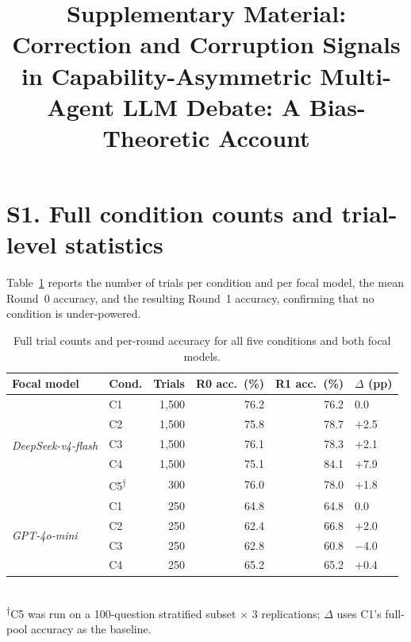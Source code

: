\documentclass[review,3p,authoryear]{elsarticle}
\begin{document}
\begin{frontmatter}

\title{Supplementary Material:\\
Correction and Corruption Signals in Capability-Asymmetric
Multi-Agent LLM Debate:
A Bias-Theoretic Account}



\end{frontmatter}

\linenumbers

\section*{S1. Full condition counts and trial-level statistics}
\label{ssec:counts}

Table~\ref{stab:fullcounts} reports the number of trials per condition and
per focal model, the mean Round~0 accuracy, and the resulting Round~1
accuracy, confirming that no condition is under-powered.

\begin{table}[h]
\centering
\small
\caption{Full trial counts and per-round accuracy for all five conditions
and both focal models.
\label{stab:fullcounts}}
\begin{tabular}{@{}llrrrl@{}}
\toprule
Focal model & Cond. & Trials & R0 acc.\ (\%) & R1 acc.\ (\%) & $\Delta$ (pp) \\
\midrule
\multirow{5}{*}{\textit{DeepSeek-v4-flash}}
  & C1 & 1{,}500 & 76.2 & 76.2 & 0.0 \\
  & C2 & 1{,}500 & 75.8 & 78.7 & $+$2.5 \\
  & C3 & 1{,}500 & 76.1 & 78.3 & $+$2.1 \\
  & C4 & 1{,}500 & 75.1 & 84.1 & $+$7.9 \\
  & C5\textsuperscript{$\dagger$} & 300   & 76.0 & 78.0 & $+$1.8 \\
\midrule
\multirow{4}{*}{\textit{GPT-4o-mini}}
  & C1 & 250   & 64.8 & 64.8 & 0.0 \\
  & C2 & 250   & 62.4 & 66.8 & $+$2.0 \\
  & C3 & 250   & 62.8 & 60.8 & $-$4.0 \\
  & C4 & 250   & 65.2 & 65.2 & $+$0.4 \\
\bottomrule
\end{tabular}
\\[2pt]
{\footnotesize\textsuperscript{$\dagger$}C5 was run on a 100-question
stratified subset $\times$ 3 replications; $\Delta$ uses C1's full-pool
accuracy as the baseline.}
\end{table}
\end{document}
